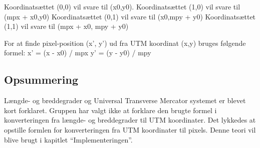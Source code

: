 Koordinatsættet (0,0) vil svare til (x0,y0).
Koordinatsættet (1,0) vil svare til (mpx + x0,y0)
Koordinatsættet (0,1) vil svare til (x0,mpy + y0)
Koordinatsættet (1,1) vil svare til (mpx + x0, mpy + y0)

For at finde pixel-position (x’, y’) ud fra UTM koordinat (x,y) bruges følgende formel:\newline
x’ = (x - x0) / mpx\newline
y’ = (y - y0) / mpy\newline

\subsection{Opsummering}
Længde- og breddegrader og Universal Transverse Mercator systemet er blevet kort forklaret. Gruppen har valgt ikke at forklare den brugte formel i konverteringen fra længde- og breddegrader til UTM koordinater. Det lykkedes at opstille formlen for konverteringen fra UTM koordinater til pixels. Denne teori vil blive brugt i kapitlet “Implementeringen”. 